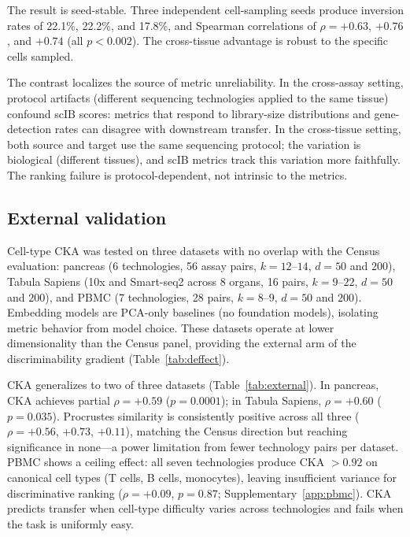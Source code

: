 \documentclass[11pt]{article}
\begin{document}
The result is seed-stable. Three independent cell-sampling seeds produce
inversion rates of 22.1\%, 22.2\%, and 17.8\%, and Spearman
correlations of $\rho = +0.63$, $+0.76$, and $+0.74$ (all
$p < 0.002$). The cross-tissue advantage is robust to the specific
cells sampled.

The contrast localizes the source of metric unreliability. In the
cross-assay setting, protocol artifacts (different sequencing
technologies applied to the same tissue) confound scIB scores: metrics
that respond to library-size distributions and gene-detection rates
can disagree with downstream transfer. In the cross-tissue setting, both
source and target use the same sequencing protocol; the variation is
biological (different tissues), and scIB metrics track this variation
more faithfully. The ranking failure is protocol-dependent, not
intrinsic to the metrics.


\subsection{External validation}
\label{sec:external}

Cell-type CKA was tested on three datasets with no overlap with the
Census evaluation: pancreas \citep{luecken2022scib} (6 technologies, 56
assay pairs, $k = 12$--$14$, $d = 50$ and $200$), Tabula Sapiens
\citep{tabulasapiens2022} (10x and Smart-seq2 across 8 organs, 16
pairs, $k = 9$--$22$, $d = 50$ and $200$), and PBMC
\citep{ding2020systematic} (7 technologies, 28 pairs, $k = 8$--$9$,
$d = 50$ and $200$). Embedding models are PCA-only baselines (no
foundation models), isolating metric behavior from model choice. These
datasets operate at lower dimensionality than the Census panel,
providing the external arm of the discriminability gradient
(Table~\ref{tab:deffect}).

CKA generalizes to two of three datasets
(Table~\ref{tab:external}). In pancreas, CKA achieves partial
$\rho = +0.59$ ($p = 0.0001$); in Tabula Sapiens, $\rho = +0.60$
($p = 0.035$). Procrustes similarity is consistently positive across all
three ($\rho = +0.56$, $+0.73$, $+0.11$), matching the Census direction
but reaching significance in none---a power limitation from fewer
technology pairs per dataset. PBMC shows a ceiling effect: all seven
technologies produce CKA $> 0.92$ on canonical cell types (T cells, B
cells, monocytes), leaving insufficient variance for discriminative
ranking ($\rho = +0.09$, $p = 0.87$; Supplementary~\ref{app:pbmc}). CKA
predicts transfer when cell-type difficulty varies across technologies
and fails when the task is uniformly easy.
\end{document}
